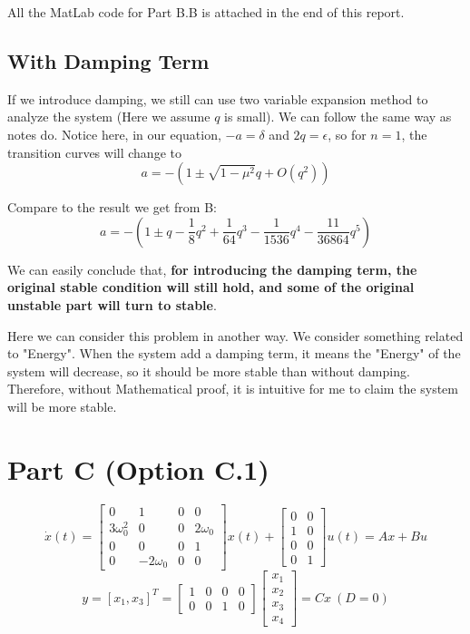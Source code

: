 \documentclass{article}
\begin{document}
All the MatLab code for Part B.B is attached in the end of this report.

\subsection{With Damping Term}
If we introduce damping, we still can use two variable expansion method to analyze the system (Here we assume $q$ is small). We can follow the same way as notes do. Notice here, in our equation, $-a = \delta$ and $2q = \epsilon$, so for $n = 1$, the transition curves will change to 
$$a = -(1 \pm \sqrt{1-\mu^2}q + O(q^2))$$

Compare to the result we get from B:
$$a = -(1 \pm q - \frac{1}{8} q^2 + \frac{1}{64} q^3 - \frac{1}{1536}q^4 - \frac{11}{36864}q^5)$$

We can easily conclude that, \textbf{for introducing the damping term, the original stable condition will still hold, and some of the original unstable part will turn to stable}.

Here we can consider this problem in another way. We consider something related to "Energy". When the system add a damping term, it means the "Energy" of the system will decrease, so it should be more stable than without damping. Therefore, without Mathematical proof, it is intuitive for me to claim the system will be more stable. 

\section{Part C (Option C.1)}
$$\dot{x}(t) =  \left[
 \begin{matrix}
   0 & 1 & 0 & 0 \\
   3\omega_0^2 & 0 & 0 & 2\omega_0 \\
   0 & 0 & 0 & 1 \\
   0 & -2\omega_0 & 0 & 0
  \end{matrix}
  \right] x(t) + \left[
  \begin{matrix}
  0 & 0 \\
  1 & 0 \\
  0 & 0 \\
  0 & 1
  \end{matrix}
  \right] u(t) = A x + B u$$
 $$y = [x_1, x_3]^T = \left[
  \begin{matrix}
  1 & 0 & 0 & 0\\
  0 & 0 & 1 & 0
  \end{matrix}
  \right] \left[
  \begin{matrix}
  x_1 \\
  x_2 \\
  x_3 \\
  x_4
  \end{matrix}
  \right] = C x \ (D = 0)$$
\end{document}
